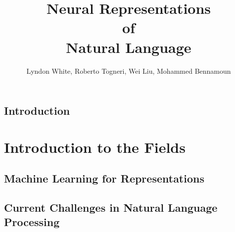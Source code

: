 \documentclass[12pt,parskip]{scrbook}
\begin{document}
\title{Neural Representations \\of\\ Natural Language}
\author{Lyndon White, Roberto Togneri, Wei Liu, Mohammed Bennamoun}
\publishers{SpringerBriefs in Computer Science}

\maketitle

\tableofcontents

\chapter{Introduction}\label{sec:introduction}

\part{Introduction to the Fields}\label{sec:introduction-to-the-fields}

\chapter{Machine Learning for Representations}\label{sec:machine-learning-for-representations}
\chapter{Current Challenges in Natural Language Processing}\label{sec:current-challenges-in-natural-language-processing}
\end{document}
